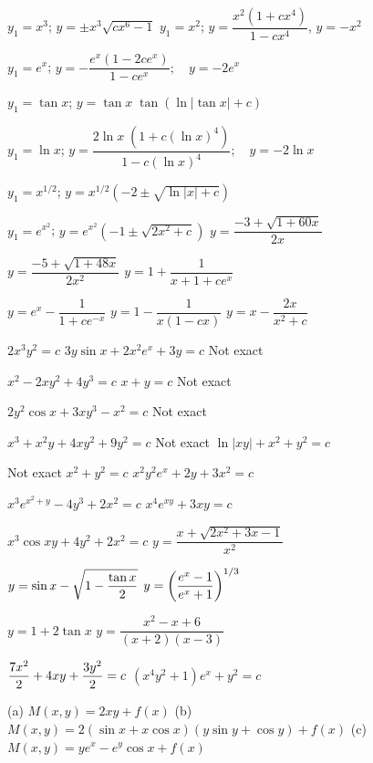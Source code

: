  $y_1=x^3$;   $y=\pm x^3\sqrt{cx^6-1}$
 $y_1=x^2$;   $y=\dfrac{x^2(1+cx^4)}{1-cx^4}$, $y=-x^2$

 $y_1=e^x$; $y=-\dfrac{e^x(1-2ce^x)}{1-ce^x};\quad y=-2e^x$

 $y_1=\tan x$;   $y=\tan x\; \tan(\ln|\tan x|+c)$

 $y_1=\ln x$;   $y=\dfrac{2\ln x\; \left(1+c(\ln
x)^4\right)}{1-c(\ln x)^4};\quad y=-2\ln x$

 $y_1=x^{1/2}$; $y=x^{1/2}(-2\pm\sqrt{\ln|x|+c})$

 $y_1=e^{x^2}$; $y=e^{x^2}(-1\pm\sqrt{2x^2+c})$
  $y=\dfrac{-3+\sqrt{1+60x}}{2x}$

  $y=\dfrac{-5+\sqrt{1+48x}}{2x^2}$
 $y=1+\dfrac{1}{x+1+ce^x}$

  $y=e^x-\dfrac{1}{1+ce^{-x}}$
 $y=1-\dfrac{1}{x(1-cx)}$
  $y=x-\dfrac{2x}{x^2+c}$



    $2x^3y^2=c$
    $3y\sin x+2x^2e^x+3y=c$
    Not exact

  $x^2-2xy^2+4y^3=c$
    $x+y=c$
   Not exact

   $2y^2\cos x+3xy^3-x^2=c$
   Not exact

   $x^3+x^2y+4xy^2+9y^2=c$
  Not exact
  $\ln |xy|+x^2+y^2=c$

  Not exact
   $x^2+y^2=c$
 $x^2y^2e^x+2y+3x^2=c$

  $x^3e^{x^2+y}-4y^3+2x^2=c$
  $x^4e^{xy}+3xy=c$

 $x^3\cos xy+4y^2+2x^2=c$
 $y=\dfrac{x+\sqrt{2x^2+3x-1}}{x^2}$

 $y=\sin x-\displaystyle{\sqrt{1-\frac{\tan x}{2}}}$
 $\displaystyle{y=\left(\frac{e^x-1}{e^x+1}\right)^{1/3}}$

  $y=1+2\tan x$
 $y=\dfrac{x^2-x+6}{(x+2)(x-3)}$

 $\displaystyle{\frac{7x^2}{2}+4xy+\frac{3y^2}{2}=c}$
  $(x^4y^2+1)e^x+y^2=c$

(a) $M(x,y)=2xy+f(x)$  (b)
 $M(x,y)=2(\sin x+x\cos x)
(y\sin y+\cos y)+f(x)$
 (c)
 $M(x,y)=ye^x-e^y\cos x+f(x)$

